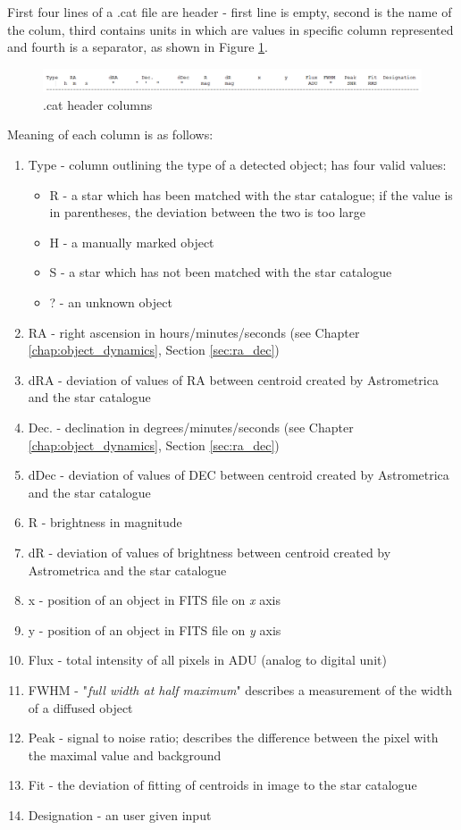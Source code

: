 	First four lines of a .cat file are header - first line is empty, second is the name of the colum, third contains units in which are values in specific column represented and fourth is a separator, as shown in Figure \ref{fig:cat_header}.
	
	\begin{figure}[H]
	  \includegraphics[width=\linewidth]{images/cat_columns}
		  \caption{.cat header columns}
	  \label{fig:cat_header}
	\end{figure}
	
	Meaning of each column is as follows:
	
	\begin{enumerate}
		\item Type - column outlining the type of a detected object; has four valid values:
		\begin{itemize}
			\item R - a star which has been matched with the star catalogue; if the value is in parentheses, the deviation between the two is too large
			\item H - a manually marked object
			\item S - a star which has not been matched with the star catalogue
			\item ? - an unknown object
		\end{itemize}
		\item RA - right ascension in hours/minutes/seconds (see Chapter \ref{chap:object_dynamics}, Section \ref{sec:ra_dec})
		\item dRA - deviation of values of RA between centroid created by Astrometrica and the star catalogue
		\item Dec. - declination in degrees/minutes/seconds (see Chapter \ref{chap:object_dynamics}, Section \ref{sec:ra_dec})
		\item dDec - deviation of values of DEC between centroid created by Astrometrica and the star catalogue
		\item R - brightness in magnitude
		\item dR - deviation of values of brightness between centroid created by Astrometrica and the star catalogue
		\item x - position of an object in FITS file on \emph{x} axis
		\item y - position of an object in FITS file on \emph{y} axis
		\item Flux - total intensity of all pixels in ADU (analog to digital unit)
		\item FWHM - "\emph{full width at half maximum}" describes a measurement of the width of a diffused object
		\item Peak - signal to noise ratio; describes the difference between the pixel with the maximal value and background
		\item Fit - the deviation of fitting of centroids in image to the star catalogue
		\item Designation - an user given input
	\end{enumerate}
	
